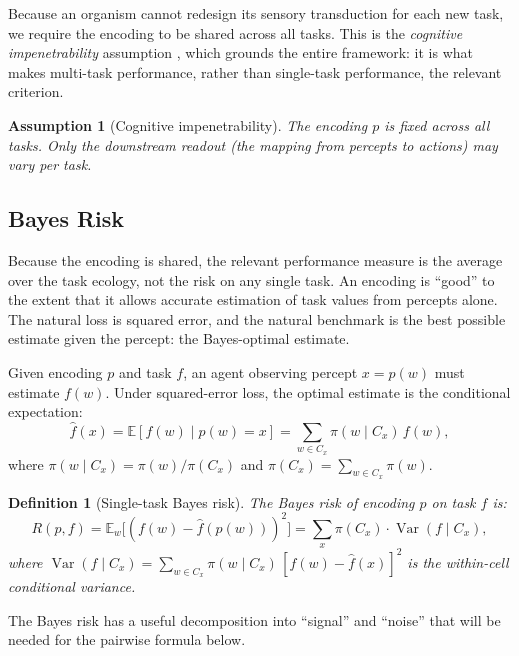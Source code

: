 \documentclass[12pt]{article}
\newtheorem{definition}[theorem]{Definition}
\newtheorem{assumption}[theorem]{Assumption}
\newcommand{\E}{\mathbb{E}}
\newcommand{\Var}{\operatorname{Var}}
\begin{document}
Because an organism cannot redesign its sensory transduction for each new task, we require the encoding to be shared across all tasks. This is the \emph{cognitive impenetrability} assumption \citep{pylyshyn_1999}, which grounds the entire framework: it is what makes multi-task performance, rather than single-task performance, the relevant criterion.

\begin{assumption}[Cognitive impenetrability]\label{def:cog-impen}
The encoding $p$ is fixed across all tasks. Only the downstream \emph{readout} (the mapping from percepts to actions) may vary per task.
\end{assumption}

\subsection{Bayes Risk}\label{sec:bayes-risk}

Because the encoding is shared, the relevant performance measure is the average over the task ecology, not the risk on any single task. An encoding is ``good'' to the extent that it allows accurate estimation of task values from percepts alone. The natural loss is squared error, and the natural benchmark is the best possible estimate given the percept: the Bayes-optimal estimate.

Given encoding $p$ and task $f$, an agent observing percept $x = p(w)$ must estimate $f(w)$. Under squared-error loss, the optimal estimate is the conditional expectation:
\begin{equation}\label{eq:cond-exp}
\hat{f}(x) = \E[f(w) \mid p(w) = x] = \sum_{w \in C_x} \pi(w \mid C_x)\, f(w),
\end{equation}
where $\pi(w \mid C_x) = \pi(w)/\pi(C_x)$ and $\pi(C_x) = \sum_{w \in C_x} \pi(w)$.

\begin{definition}[Single-task Bayes risk]\label{def:single-risk}
The Bayes risk of encoding $p$ on task $f$ is:
\begin{equation}\label{eq:bayes-risk-single}
R(p, f) = \E_w\bigl[(f(w) - \hat{f}(p(w)))^2\bigr]
         = \sum_x \pi(C_x) \cdot \Var(f \mid C_x),
\end{equation}
where $\Var(f \mid C_x) = \sum_{w \in C_x} \pi(w \mid C_x)\, [f(w) - \hat{f}(x)]^2$ is the within-cell conditional variance.
\end{definition}

The Bayes risk has a useful decomposition into ``signal'' and ``noise'' that will be needed for the pairwise formula below.
\end{document}
